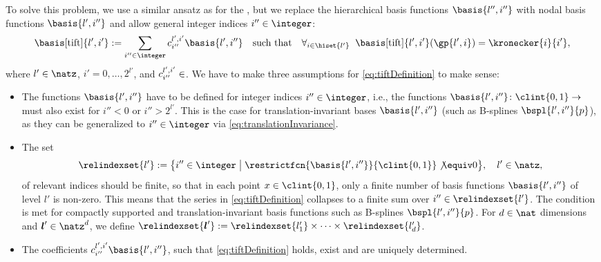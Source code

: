 To solve this problem,
we use a similar ansatz as for the \hftr,
but we replace the hierarchical basis functions $\basis{l'',i''}$
with nodal basis functions $\basis{l',i''}$ and
allow general integer indices $i'' \in \integer$:
\begin{equation}
  \label{eq:tiftDefinition}
  \basis[\tift]{l',i'}
  := \sum_{i'' \in \integer} c_{i''}^{l',i'} \basis{l',i''}
  \quad\text{such that}\quad
  \falarge{i \in \hiset{l'}}{
    \basis[\tift]{l',i'}(\gp{l',i}) = \kronecker{i}{i'},
  }
\end{equation}
where $l' \in \natz$, $i' = 0, \dotsc, 2^{l'}$, and
$c_{i''}^{l',i'} \in \real$.
We have to make three assumptions for \eqref{eq:tiftDefinition} to make sense:

\begin{itemize}
  \item
  The functions $\basis{l',i''}$ have to be defined for integer indices
  $i'' \in \integer$, i.e.,
  the functions $\basis{l',i''}\colon \clint{0, 1} \to \real$
  must also exist for $i'' < 0$ or $i'' > 2^{l'}$.
  This is the case for translation-invariant bases
  $\basis{l',i''}$ (such as B-splines $\bspl{l',i''}{p}$),
  as they can be generalized to $i'' \in \integer$
  via \cref{eq:translationInvariance}.
  
  \item
  The set
  \begin{equation}
    \relindexset{l'}
    := \big\{i'' \in \integer \bigm\vert
    \restrictfcn{\basis{l',i''}}{\clint{0, 1}} \not\equiv 0\big\},\quad
    l' \in \natz,
  \end{equation}
  of relevant indices should be finite,
  so that in each point $x \in \clint{0, 1}$,
  only a finite number of basis functions $\basis{l',i''}$ of level $l'$
  is non-zero.
  This means that the series in \eqref{eq:tiftDefinition} collapses to a
  finite sum over $i'' \in \relindexset{l'}$.
  The condition is met for compactly supported and translation-invariant
  basis functions such as B-splines $\bspl{l',i''}{p}$.
  For $d \in \nat$ dimensions and $\*l' \in \natz^d$, we define
  $\relindexset{\*l'} :=
  \relindexset{l'_1} \times \dotsb \times \relindexset{l'_d}$.
  
  \item
  The coefficients $c_{i''}^{l',i'} \basis{l',i''}$, such that
  \eqref{eq:tiftDefinition} holds, exist and are uniquely determined.
\end{itemize}

